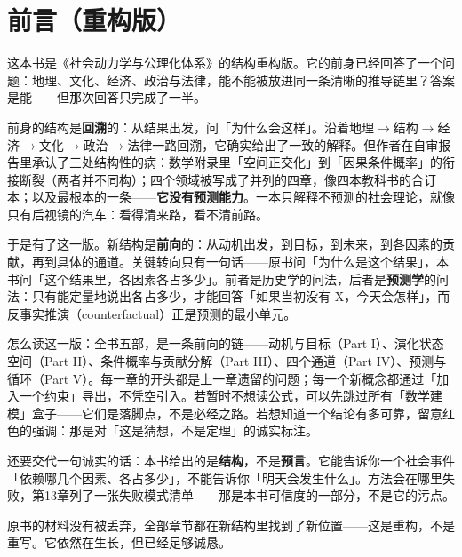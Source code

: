\chapter*{前言（重构版）}

这本书是《社会动力学与公理化体系》的结构重构版。它的前身已经回答了一个问题：地理、文化、经济、政治与法律，能不能被放进同一条清晰的推导链里？答案是能——但那次回答只完成了一半。

前身的结构是\textbf{回溯}的：从结果出发，问「为什么会这样」。沿着地理$\rightarrow$结构$\rightarrow$经济$\rightarrow$文化$\rightarrow$政治$\rightarrow$法律一路回溯，它确实给出了一致的解释。但作者在自审报告里承认了三处结构性的病：数学附录里「空间正交化」到「因果条件概率」的衔接断裂（两者并不同构）；四个领域被写成了并列的四章，像四本教科书的合订本；以及最根本的一条——\textbf{它没有预测能力}。一本只解释不预测的社会理论，就像只有后视镜的汽车：看得清来路，看不清前路。

于是有了这一版。新结构是\textbf{前向}的：从动机出发，到目标，到未来，到各因素的贡献，再到具体的通道。关键转向只有一句话——原书问「为什么是这个结果」，本书问「这个结果里，各因素各占多少」。前者是历史学的问法，后者是\textbf{预测学}的问法：只有能定量地说出各占多少，才能回答「如果当初没有 X，今天会怎样」，而反事实推演（counterfactual）正是预测的最小单元。

怎么读这一版：全书五部，是一条前向的链——动机与目标（Part I）、演化状态空间（Part II）、条件概率与贡献分解（Part III）、四个通道（Part IV）、预测与循环（Part V）。每一章的开头都是上一章遗留的问题；每一个新概念都通过「加入一个约束」导出，不凭空引入。若暂时不想读公式，可以先跳过所有「数学建模」盒子——它们是落脚点，不是必经之路。若想知道一个结论有多可靠，留意红色的强调：那是对「这是猜想，不是定理」的诚实标注。

还要交代一句诚实的话：本书给出的是\textbf{结构}，不是\textbf{预言}。它能告诉你一个社会事件「依赖哪几个因素、各占多少」，不能告诉你「明天会发生什么」。方法会在哪里失败，第13章列了一张失败模式清单——那是本书可信度的一部分，不是它的污点。

原书的材料没有被丢弃，全部章节都在新结构里找到了新位置——这是重构，不是重写。它依然在生长，但已经足够诚恳。

